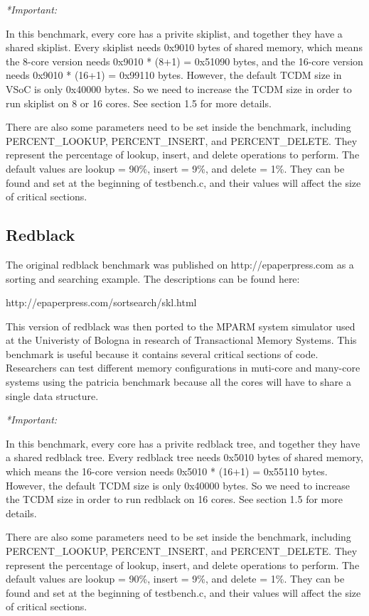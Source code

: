 \documentclass{article}
\begin{document}
\vspace{2mm}
\emph{*Important:} 

In this benchmark, every core has a privite skiplist, and together they have a
shared skiplist. Every skiplist needs 0x9010 bytes of shared memory, which 
means the 8-core version needs 0x9010 * (8+1) = 0x51090 bytes,
and the 16-core version needs 0x9010 * (16+1) = 0x99110 bytes. However, the 
default TCDM size in VSoC is only 0x40000 bytes. So we need to 
increase the TCDM size in order to run skiplist on 8 or 16 cores.
 See section 1.5 for more details.

There are also some parameters need to be set inside the benchmark, including 
 PERCENT\_LOOKUP, PERCENT\_INSERT, and PERCENT\_DELETE. They 
represent the percentage of lookup, insert, and delete operations to perform.
The default values are lookup = 90\%, insert = 9\%, and 
delete = 1\%. They can be found and set at the beginning of testbench.c,
and their values will affect the size of critical sections. 

\subsection{Redblack}

The original redblack benchmark was published on http://epaperpress.com
as a sorting and searching example. The descriptions can be found here:

http://epaperpress.com/sortsearch/skl.html

This version of redblack was then ported to the MPARM system simulator used at 
the Univeristy of Bologna in research of Transactional Memory Systems. This
benchmark is useful because it contains several critical sections of code. 
Researchers can test different memory configurations in muti-core and many-core 
systems using the patricia benchmark because all the cores will have to share a 
single data structure. 

\vspace{2mm}
\emph{*Important:} 

In this benchmark, every core has a privite redblack tree, and together they 
have a shared redblack tree. Every redblack tree needs 0x5010 bytes of shared 
memory, which means the 16-core version needs 0x5010 * (16+1) = 0x55110 bytes. 
However, the default TCDM size is only 0x40000 bytes. 
So we need to increase the TCDM size in order to run redblack on 16 cores. 
See section 1.5 for more details.

There are also some parameters need to be set inside the benchmark, including 
 PERCENT\_LOOKUP, PERCENT\_INSERT, and PERCENT\_DELETE. They 
represent the percentage of lookup, insert, and delete operations to perform.
The default values are lookup = 90\%, insert = 9\%, and 
delete = 1\%. They can be found and set at the beginning of testbench.c,
and their values will affect the size of critical sections. 
\end{document}
